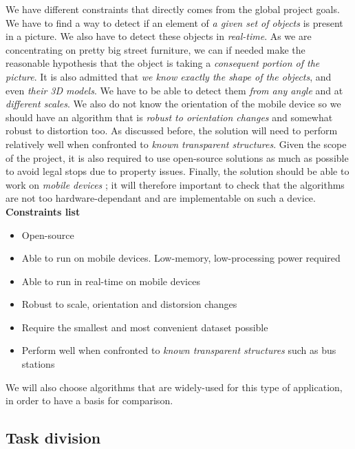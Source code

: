 \documentclass[10pt]{article}
\begin{document}
We have different constraints that directly comes from the global project goals. We have to find a way to detect if an element of \emph{a given set of objects} is present in a picture. We also have to detect these objects in \emph{real-time}. As we are concentrating on pretty big street furniture, we can if needed make the reasonable hypothesis that the object is taking a \emph{consequent portion of the picture}. It is also admitted that \emph{we know exactly the shape of the objects}, and even \emph{their 3D models}. We have to be able to detect them \emph{from any angle} and at \emph{different scales}. We also do not know the orientation of the mobile device
so we should have an algorithm that is \emph{robust to orientation changes} and somewhat robust to distortion too. As discussed before, the solution will need to perform relatively well when confronted to \emph{known transparent structures}.
Given the scope of the project, it is also required to use open-source solutions as much as possible to avoid legal stops due to property issues.
Finally, the solution should be able to work on \emph{mobile devices} ; it will therefore important to check that the algorithms are not too hardware-dependant and are implementable on such a device.\\


\textbf{Constraints list}

\begin{itemize}
    \item Open-source
    \item Able to run on mobile devices. Low-memory, low-processing power required
    \item Able to run in real-time on mobile devices
    \item Robust to scale, orientation and distorsion changes
    \item Require the smallest and most convenient dataset possible
    \item Perform well when confronted to \emph{known transparent structures} such as bus stations
\end{itemize}

We will also choose algorithms that are widely-used for this type of application, in order to have a basis for comparison.


    \subsection{Task division}
    
\end{document}
